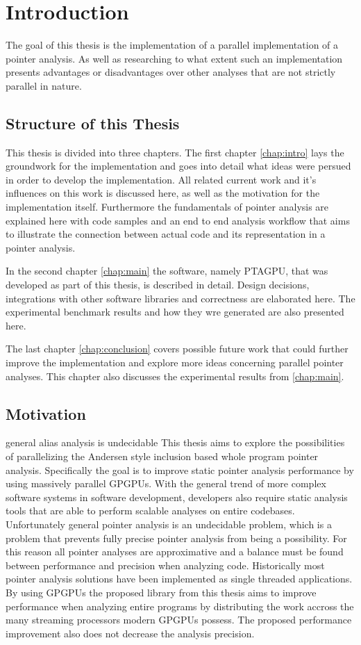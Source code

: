 \chapter{Introduction} \label{chap:intro}
The goal of this thesis is the implementation of a parallel implementation of a pointer analysis. As well as researching to what extent such an implementation presents advantages or disadvantages over other analyses that are not strictly parallel in nature.

\section{Structure of this Thesis}
This thesis is divided into three chapters.
The first chapter \autoref{chap:intro} lays the groundwork for the implementation and goes into detail what ideas were persued in order to develop the implementation. All related current work and it's influences on this work is discussed here, as well as the motivation for the implementation itself. Furthermore the fundamentals of pointer analysis are explained here with code samples and an end to end analysis workflow that aims to illustrate the connection between actual code and its representation in a pointer analysis.

In the second chapter \autoref{chap:main} the software, namely PTAGPU, that was developed as part of this thesis, is described in detail. Design decisions, integrations with other software libraries and correctness are elaborated here.
The experimental benchmark results and how they wre generated are also presented here.

The last chapter \autoref{chap:conclusion} covers possible future work that could further improve the implementation and explore more ideas concerning parallel pointer analyses.
This chapter also discusses the experimental results from \autoref{chap:main}.

\section{Motivation}
general alias analysis is undecidable
This thesis aims to explore the possibilities of parallelizing the Andersen style inclusion based whole program pointer analysis. Specifically the goal is to improve static pointer analysis performance by using massively parallel GPGPUs.
With the general trend of more complex software systems in software development, developers also require static analysis tools that are able to perform scalable analyses on entire codebases.
Unfortunately general pointer analysis is an undecidable problem, which is a problem that prevents fully precise pointer analysis from being a possibility.
For this reason all pointer analyses are approximative and a balance must be found between performance and precision when analyzing code.
Historically most pointer analysis solutions have been implemented as single threaded applications. By using GPGPUs the proposed library from this thesis aims to improve performance when analyzing entire programs by distributing the work accross the many streaming processors modern GPGPUs possess. The proposed performance improvement also does not decrease the analysis precision.
